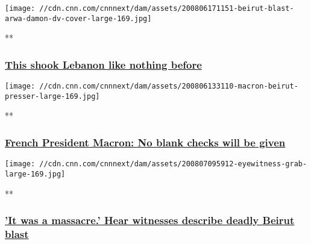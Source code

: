 \href{/videos/world/2020/08/06/beirut-explosion-arwa-damon-lon-orig.cnn/video/playlists/beirut-explosion/}{}

\texttt{[image: //cdn.cnn.com/cnnnext/dam/assets/200806171151-beirut-blast-arwa-damon-dv-cover-large-169.jpg]}

**

\hypertarget{this-shook-lebanon-like-nothing-before}{%
\subsubsection{\texorpdfstring{\href{/videos/world/2020/08/06/beirut-explosion-arwa-damon-lon-orig.cnn/video/playlists/beirut-explosion/}{This
shook Lebanon like nothing
before}}{This shook Lebanon like nothing before}}\label{this-shook-lebanon-like-nothing-before}}

\href{/videos/world/2020/08/06/emmanuel-macron-lebanon-leaders-blank-check-sot-vpx.afptv/video/playlists/beirut-explosion/}{}

\texttt{[image: //cdn.cnn.com/cnnnext/dam/assets/200806133110-macron-beirut-presser-large-169.jpg]}

**

\hypertarget{french-president-macron-no-blank-checks-will-be-given}{%
\subsubsection{\texorpdfstring{\href{/videos/world/2020/08/06/emmanuel-macron-lebanon-leaders-blank-check-sot-vpx.afptv/video/playlists/beirut-explosion/}{French
President Macron: No blank checks will be
given}}{French President Macron: No blank checks will be given}}\label{french-president-macron-no-blank-checks-will-be-given}}

\href{/videos/world/2020/08/06/beirut-blast-eyewitness-reaction-lon-orig-na.cnn/video/playlists/beirut-explosion/}{}

\texttt{[image: //cdn.cnn.com/cnnnext/dam/assets/200807095912-eyewitness-grab-large-169.jpg]}

**

\hypertarget{it-was-a-massacre-hear-witnesses-describe-deadly-beirut-blast}{%
\subsubsection{\texorpdfstring{\href{/videos/world/2020/08/06/beirut-blast-eyewitness-reaction-lon-orig-na.cnn/video/playlists/beirut-explosion/}{'It
was a massacre.' Hear witnesses describe deadly Beirut
blast}}{'It was a massacre.' Hear witnesses describe deadly Beirut blast}}\label{it-was-a-massacre-hear-witnesses-describe-deadly-beirut-blast}}

